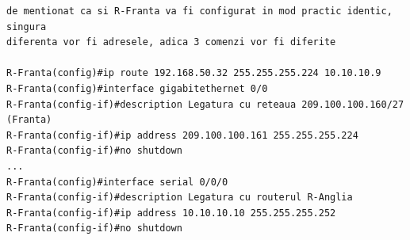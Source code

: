 \documentclass{article}
\begin{document}
\begin{verbatim}
de mentionat ca si R-Franta va fi configurat in mod practic identic, singura 
diferenta vor fi adresele, adica 3 comenzi vor fi diferite

R-Franta(config)#ip route 192.168.50.32 255.255.255.224 10.10.10.9
R-Franta(config)#interface gigabitethernet 0/0
R-Franta(config-if)#description Legatura cu reteaua 209.100.100.160/27 (Franta)
R-Franta(config-if)#ip address 209.100.100.161 255.255.255.224
R-Franta(config-if)#no shutdown
...
R-Franta(config)#interface serial 0/0/0
R-Franta(config-if)#description Legatura cu routerul R-Anglia
R-Franta(config-if)#ip address 10.10.10.10 255.255.255.252
R-Franta(config-if)#no shutdown

\end{verbatim}
\end{document}
